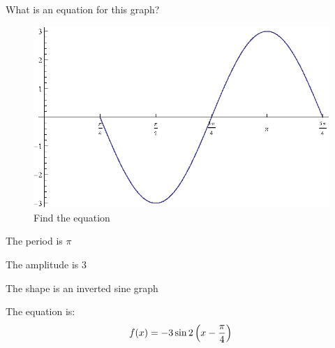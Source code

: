 \documentclass[fleqn,addpoints]{exam}
\begin{document}
\begin{questions}

    \question[10]
      What is an equation for this graph?
      
      \begin{figure}[H]
        \centering
        \includegraphics[scale=0.7]{find_equation.eps}
        \caption{Find the equation}
      \end{figure}

      \begin{solution}
        \begin{itemize*}
          \item The period is $\pi$
          \item The amplitude is 3
          \item The shape is an inverted sine graph
        \end{itemize*}

        The equation is:
        \[
          f(x) = - 3 \sin 2 \left( x - \frac{\pi}{4} \right) \\
        \]

      \end{solution}


\end{questions}
\end{document}
